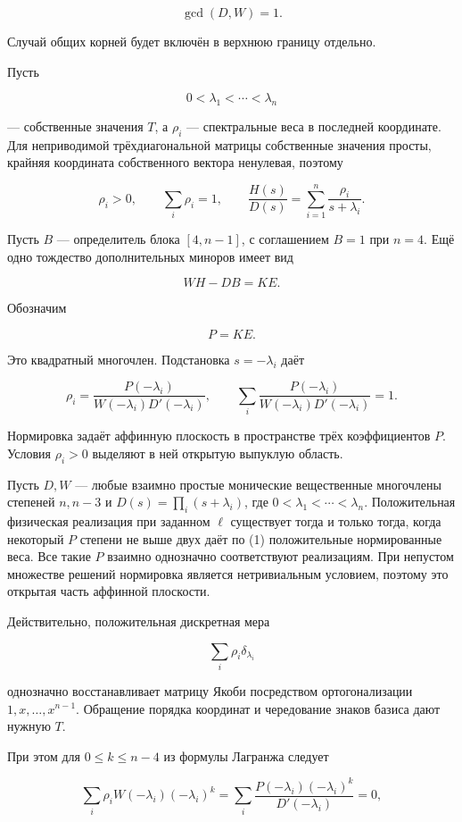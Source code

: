 \documentclass[11pt,a4paper]{article}
\begin{document}
\[
\gcd(D,W)=1.
\]

Случай общих корней будет включён в верхнюю границу отдельно.

Пусть

\[
0<\lambda_1<\cdots<\lambda_n
\]

— собственные значения \(T\), а \(\rho_i\) — спектральные веса в последней координате. Для неприводимой трёхдиагональной матрицы собственные значения просты, крайняя координата собственного вектора ненулевая, поэтому

\[
\rho_i>0,\qquad \sum_i\rho_i=1,
\qquad
\frac{H(s)}{D(s)}
=\sum_{i=1}^n\frac{\rho_i}{s+\lambda_i}.
\]

Пусть \(B\) — определитель блока \([4,n-1]\), с соглашением \(B=1\) при \(n=4\). Ещё одно тождество дополнительных миноров имеет вид

\[
WH-DB=KE.
\]

Обозначим

\[
P=KE.
\]

Это квадратный многочлен. Подстановка \(s=-\lambda_i\) даёт

\[
\boxed{
\rho_i=
\frac{P(-\lambda_i)}
{W(-\lambda_i)D'(-\lambda_i)},\qquad
\sum_i
\frac{P(-\lambda_i)}
{W(-\lambda_i)D'(-\lambda_i)}
=1.}
\tag{1}
\]

Нормировка задаёт аффинную плоскость в пространстве трёх коэффициентов \(P\). Условия \(\rho_i>0\) выделяют в ней открытую выпуклую область.

Пусть \(D,W\) — любые взаимно простые монические вещественные многочлены степеней \(n,n-3\) и \(D(s)=\prod_i(s+\lambda_i)\), где \(0<\lambda_1<\cdots<\lambda_n\). Положительная физическая реализация при заданном \(\ell\) существует тогда и только тогда, когда некоторый \(P\) степени не выше двух даёт по (1) положительные нормированные веса. Все такие \(P\) взаимно однозначно соответствуют реализациям. При непустом множестве решений нормировка является нетривиальным условием, поэтому это открытая часть аффинной плоскости.

Действительно, положительная дискретная мера

\[
\sum_i\rho_i\delta_{\lambda_i}
\]

однозначно восстанавливает матрицу Якоби посредством ортогонализации \(1,x,\ldots,x^{n-1}\). Обращение порядка координат и чередование знаков базиса дают нужную \(T\).

При этом для \(0\le k\le n-4\) из формулы Лагранжа следует

\[
\sum_i\rho_i W(-\lambda_i)(-\lambda_i)^k
=
\sum_i\frac{P(-\lambda_i)(-\lambda_i)^k}{D'(-\lambda_i)}
=0,
\]
\end{document}
